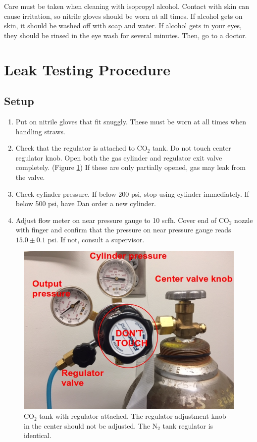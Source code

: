 \documentclass[A4,12pt]{article}
\begin{document}
Care must be taken when cleaning with isopropyl alcohol. Contact with skin can cause irritation, so nitrile gloves should be worn at all times. If alcohol gets on skin, it should be washed off with soap and water. If alcohol gets in your eyes, they should be rinsed in the eye wash for several minutes. Then, go to a doctor.


\newpage

\section{Leak Testing Procedure}

\subsection{Setup}
\begin{enumerate}
	\item Put on nitrile gloves that fit snuggly. These must be worn at all times when handling straws.
	\item Check that the regulator is attached to CO$_2$ tank. Do not touch center regulator knob. Open both the gas cylinder and regulator exit valve completely. (Figure \ref{co2tank}) If these are only partially opened, gas may leak from the valve.   
	\item Check cylinder pressure. If below 200 psi, stop using cylinder immediately. If below 500 psi, have Dan order a new cylinder.
	\item Adjust flow meter on near pressure gauge to 10 scfh. Cover end of CO$_2$ nozzle with finger and confirm that the pressure on near pressure gauge reads $15.0 \pm 0.1$ psi. If not, consult a supervisor.
\end{enumerate}

\begin{figure}
	\center
	\includegraphics[scale=0.5]{co2tank}
	\caption{CO$_2$ tank with regulator attached. The regulator adjustment knob in the center should not be adjusted. The N$_2$ tank regulator is identical.} \label{co2tank}
\end{figure}
\end{document}
